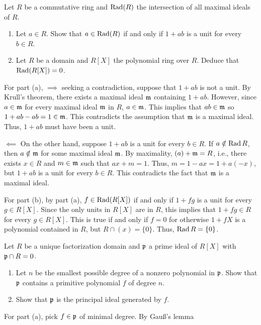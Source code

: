 \begin{problem}
  Let \(R\) be a commutative ring and \(\operatorname{Rad}(R)\) the intersection of all
  maximal ideals of \(R\).
  \begin{enumerate}[label=(\alph*)]
  \item Let \(a\in R\). Show that \(a\in\operatorname{Rad}(R)\) if and only if \(1+ab\)
    is a unit for every \(b\in R\).
  \item Let \(R\) be a domain and \(R[X]\) the polynomial ring over
    \(R\). Deduce that \(\operatorname{Rad}(R[X])=0\).
  \end{enumerate}
\end{problem}
\begin{solution}
  For part (a), \(\implies\) seeking a contradiction, suppose that \(1+ab\)
  is not a unit. By Krull's theorem, there exists a maximal ideal
  \(\mathfrak{m}\) containing \(1+ab\). However, since \(a\in\mathfrak{m}\) for every
  maximal ideal \(\mathfrak{m}\) in \(R\), \(a\in\mathfrak{m}\). This implies that
  \(ab\in\mathfrak{m}\) so \(1+ab-ab=1\in\mathfrak{m}\). This contradicts the
  assumption that \(\mathfrak{m}\) is a maximal ideal. Thus, \(1+ab\) must have
  been a unit.

  \(\impliedby\) On the other hand, suppose \(1+ab\) is a unit for every
  \(b\in R\). If \(a\notin\operatorname{Rad} R\), then \(a\notin\mathfrak{m}\) for some maximal
  ideal \(\mathfrak{m}\). By maximality, \((a)+\mathfrak{m}=R\), i.e., there exists
  \(x\in R\) and \(m\in\mathfrak{m}\) such that \(ax+m=1\). Thus,
  \(m=1-ax=1+a(-x)\), but \(1+ab\) is a unit for every \(b\in R\). This
  contradicts the fact that \(\mathfrak{m}\) is a maximal ideal.

  For part (b), by part (a), \(f\in\operatorname{Rad}(R[X])\) if and only if
  \(1+fg\) is a unit for every \(g\in R[X]\). Since the only units in
  \(R[X]\) are in \(R\), this implies that \(1+fg\in R\) for every \(g\in
  R[X]\). This is true if and only if \(f=0\) for otherwise \(1+fX\) is a
  polynomial contained in \(R\), but \(R\cap(x)=\{0\}\). Thus, \(\operatorname{Rad}
  R=\{0\}\).
\end{solution}

\begin{problem}
  Let \(R\) be a unique factorization domain and \(\mathfrak{p}\) a prime ideal
  of \(R[X]\) with \(\mathfrak{p}\cap R=0\).
  \begin{enumerate}[label=(\alph*)]
  \item Let \(n\) be the smallest possible degree of a nonzero polynomial
    in \(\mathfrak{p}\). Show that \(\mathfrak{p}\) contains a primitive polynomial
    \(f\) of degree \(n\).
  \item Show that \(\mathfrak{p}\) is the principal ideal generated by \(f\).
  \end{enumerate}
\end{problem}
\begin{solution}
  For part (a), pick \(f\in\mathfrak{p}\) of minimal degree. By Gauß's lemma
\end{solution}

